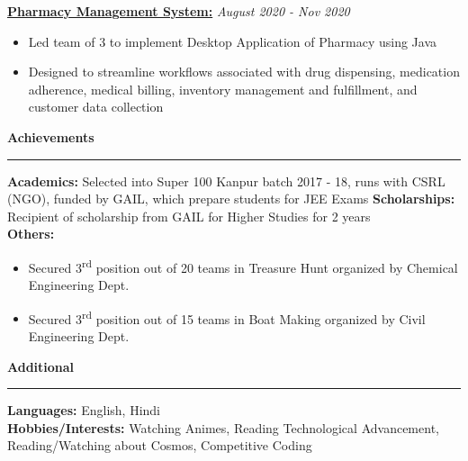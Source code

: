 \documentclass[11pt]{article}
\begin{document}
    	\hspace{8pt}\href{https://github.com/Abhay811/Advanced-Online-Examination}{\textbf{Pharmacy Management System:}}
    	\hfill
    	\textit{August 2020 - Nov 2020}
    	\vspace{-6pt}
    	\begin{itemize}
        	\setlength{\itemsep}{0pt}
        	\setlength{\parskip}{0pt}
        	\setlength{\parsep}{-4pt}
        	\item Led team of 3 to implement Desktop Application of Pharmacy using Java
        	\item Designed to streamline workflows associated with drug dispensing, medication adherence, medical billing, inventory management and fulfillment, and customer data collection
        \end{itemize}
    \textbf{\large{Achievements}}
    	\vspace{5pt}
    	\hrule
    	\vspace{4pt}
    	\textbf{Academics:} Selected into Super 100 Kanpur batch 2017 - 18, runs with CSRL (NGO), funded by GAIL, which prepare students for JEE Exams
    	\newline
    	\textbf{Scholarships:} Recipient of scholarship from GAIL for Higher Studies for 2 years\\
    	\textbf{Others:}
   	    \begin{itemize}
        	\setlength{\itemsep}{0pt}
        	\setlength{\parskip}{0pt}
        	\setlength{\parsep}{0pt}
        	\item Secured 3\textsuperscript{rd} position out of 20 teams in Treasure Hunt organized by Chemical Engineering Dept.
        	\item Secured 3\textsuperscript{rd} position out of 15 teams in Boat Making organized by Civil Engineering Dept.
    	\end{itemize}
    
    \textbf{\large{Additional}}
    	\vspace{5pt}
    	\hrule
    	\vspace{4pt}
    	\textbf{Languages:} English, Hindi\\
    	\textbf{Hobbies/Interests:} Watching Animes, Reading Technological Advancement, Reading/Watching about Cosmos, Competitive Coding
    
\end{document}
